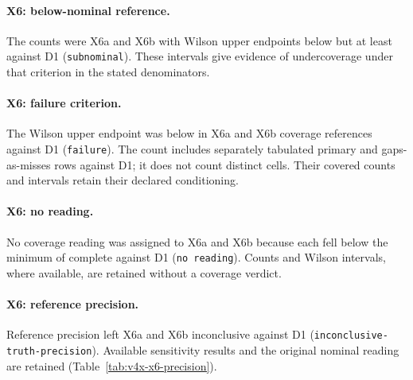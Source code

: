 \paragraph{X6: below-nominal reference.}
The counts were  X6a  and  X6b  with Wilson upper endpoints below  but at least  against D1 (\texttt{subnominal}).
These intervals give evidence of undercoverage under that criterion in the stated denominators.

\paragraph{X6: failure criterion.}
The Wilson upper endpoint was below  in  X6a and  X6b coverage references against D1 (\texttt{failure}).
The count includes separately tabulated primary and gaps-as-misses rows against D1; it does not count distinct cells. Their covered counts and intervals retain their declared conditioning.

\paragraph{X6: no reading.}
No coverage reading was assigned to  X6a  and  X6b  because each fell below the minimum of  complete  against D1 (\texttt{no reading}).
Counts and Wilson intervals, where available, are retained without a coverage verdict.

\paragraph{X6: reference precision.}
Reference precision left  X6a  and  X6b  inconclusive against D1 (\texttt{inconclusive-truth-precision}).
Available sensitivity results and the original nominal reading are retained (Table~\ref{tab:v4x-x6-precision}).

